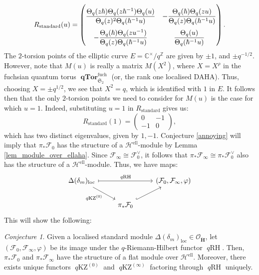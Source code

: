 \documentclass[a4paper]{report}
\theoremstyle{theorem}
\theoremstyle{definition}
\theoremstyle{remark}
\theoremstyle{proposition}
\theoremstyle{conjecture}
\newtheorem{conjecture}{Conjecture}
\theoremstyle{lemma}
\theoremstyle{corollary}
\theoremstyle{exercise}
\theoremstyle{example}
\newcommand{\C}{\mathbb{C}}
\newcommand{\mcal}{\mathcal}
\newcommand{\on}{\operatorname}
\newcommand{\qTor}{\on{\mathbf{qTor}}}
\newcommand{\qKZ}{\on{\mathit{q}KZ}}
\newcommand{\qRH}{\on{\mathit{q}RH}}
\begin{document}
  $$R_{\on{standard}}(u) = \renewcommand\arraystretch{2.5}\begin{pmatrix}
      \displaystyle\frac{\Theta_q(z\hbar) \Theta_q(z\hbar^{-1}) \Theta_q(u)}{\Theta_q(z)^2 \Theta_q(\hbar^{-1} u)} & -\displaystyle\frac{\Theta_q(\hbar)\Theta_q(zu)}{\Theta_q(z) \Theta_q(\hbar^{-1}u)}\\ 
      -\displaystyle\frac{\Theta_q(\hbar) \Theta_q(zu^{-1})}{\Theta_q(z) \Theta_q(\hbar^{-1}u)} & \displaystyle\frac{\Theta_q(u)}{\Theta_q(\hbar^{-1}u)}
  \end{pmatrix}.$$ 
  The $2$-torsion points of the elliptic curve $E = \C^\times/q^{\mathbb{Z}}$ are given by
  $\pm 1$, and $\pm q^{-1/2}$.
  However, note that $M(u)$ is really a matrix $M(X^2)$, where $X = X^\rho$ in the fuchsian quantum torus 
  $\qTor^{\on{fuch}}_{\mathfrak{S}_2}$ (or, the rank one localised DAHA). Thus, choosing $X = \pm q^{1/2}$, we 
  see that $X^2 = q$, which is identified with $1$ in $E$. It follows then that the only $2$-torsion points we need 
  to consider for $M(u)$ is the case for which $u = 1$. Indeed, substituting $u = 1$ in $R_{\on{standard}}$ gives us:
  $$R_{\on{standard}}(1) = \begin{pmatrix}
      0 & -1\\ 
      -1 & 0
  \end{pmatrix},$$
  which has two distinct eigenvalues, given by $1,-1$.
  Conjecture \ref{annoying} will imply that $\pi_\ast \mcal{F}_0$ has the structure of a $\mcal{H}^{\on{ell}}$-module by 
  Lemma \ref{lem_module_over_ellaha}. Since $\mcal{F}_\infty \cong \mcal{F}_0^\vee$, it follows that 
  $\pi_\ast\mcal{F}_\infty \cong \pi_\ast\mcal{F}_0^\vee$ also has the structure of a $\mcal{H}^{\on{ell}}$-module.
  Thus, we have maps:
  $$\begin{tikzcd}
      \Delta(\delta_m)_{\operatorname{loc}} \arrow[rr, "\qRH", maps to] \arrow[rd, "\qKZ^{(0)}"'] &                             & {(\mcal{F}_0,\mcal{F}_\infty,\varphi)} \\
                                                                                            & \pi_\ast\mcal{F}_0 \arrow[ru, hook] &                                       
  \end{tikzcd}$$ 
  This will show the following:
  
  \begin{conjecture}\label{std_mod}
      Given a localised standard module $\Delta(\delta_m)_{\on{loc}} \in \mcal{O}_{\mathbf{\ddot{\mathbf{H}}}}$, let 
      $(\mcal{F}_0, \mcal{F}_\infty, \varphi)$ be its image under the $q$-Riemann-Hilbert functor 
      $\qRH$. Then, $\pi_\ast\mcal{F}_0$ and $\pi_\ast\mcal{F}_\infty$ have the structure of a flat 
      module over $\mcal{H}^{\on{ell}}$. Moreover, there exists unique functors $\qKZ^{(0)}$ and 
      $\qKZ^{(\infty)}$ factoring through $\qRH$ uniquely.
  \end{conjecture}
  
\end{document}
